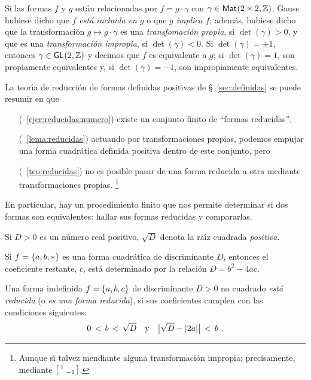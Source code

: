 Si las formas $f$ y $g$ est\'an relacionadas por $f=g\cdot\gamma$
con $\gamma\in\mathsf{Mat}_{}(2\times 2,\mathbb{Z})$, Gauss hubiese dicho que
\emph{$f$ est\'a incluida en $g$} o que \emph{$g$ implica $f$};
adem\'as, hubiese dicho que la transformaci\'on $g\mapsto g\cdot\gamma$
es una \emph{transfomaci\'on propia}, si $\det(\gamma)>0$, y que
es una \emph{transformaci\'on impropia}, si $\det(\gamma)<0$.
\cite[\S~157]{Gauss}
Si $\det(\gamma)=\pm 1$, entonces $\gamma\in\mathsf{GL}_{}(2,\mathbb{Z})$ y
decimos que $f$ es equivalente a $g$; si $\det(\gamma)=1$, son
propiamente equivalentes y, si $\det(\gamma)=-1$, son impropiamente
equivalentes.

La teor\'{\i}a de reducci\'on de formas definidas positivas de
\S~\ref{sec:definidas} se puede resumir en que
\begin{itemize}
	\item[(\ejername~\ref{ejer:reducidas:numero})]
		existe un conjunto finito de ``formas reducidas'',
	\item[(\lemaname~\ref{lema:reducidas})]
		actuando por transformaciones propias,
		podemos empujar una forma cuadr\'atica definida positiva
		dentro de este conjunto, pero
	\item[(\teoname~\ref{teo:reducidas})]
		no es posible pasar de una forma reducida a otra mediante
		transformaciones propias.%
		\footnote{
			Aunque s\'{\i} talvez mendiante alguna
			transformaci\'on impropia; precisamente, mediante
			$ \left[\begin{smallmatrix}  1 & \\ & -1  \end{smallmatrix}\right]$.
		}
\end{itemize}
%
En particular, hay un procedimiento finito que nos permite determinar
si dos formas son equivalentes: hallar sus formas reducidas y compararlas.

Si $D>0$ es un n\'umero real positivo, $\sqrt D$ denota la ra\'{\i}z
cuadrada \emph{positiva}.

\begin{obsIndefinidas}\label{obs:coeficientes:dos-de-tres}
	Si $f=\left\{a,b,*\right\}$ es una forma cuadr\'atica de discriminante
	$D$, entonces el coeficiente restante, $c$, est\'a determinado
	por la relaci\'on $D=b^2-4ac$.
\end{obsIndefinidas}

\begin{defIndefinidas}\label{def:indefinidas:reducida}
	Una forma indefinida $f=\left\{a,b,c\right\}$ de discriminante $D>0$
	no cuadrado \emph{est\'a reducida} (o \emph{es una forma reducida}),
	si sus coeficientes cumplen con las condiciones siguientes:
	\begin{displaymath}
		0\,<\,b\,<\,\sqrt D\quad\text{y}\quad
		\big|\sqrt D-|2a|\big|\,<\,b
		\text{ .}
	\end{displaymath}
\end{defIndefinidas}

